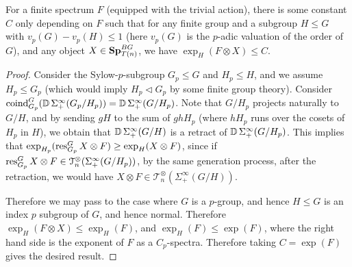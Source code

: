 	\begin{lemma}\label{Unif_nilp_exp_fin_sp}
		For a finite spectrum $F$ (equipped with the trivial action), there is some constant $C$ only depending on $F$ such that for any finite group and a subgroup $H\leq G$ with $v_p(G)-v_p(H)\leq 1$ (here $v_p(G)$ is the $p$-adic valuation of the order of $G$), and any object $X\in\mathbf{Sp}_{T(n)}^{BG}$, we have $\exp_H(F\otimes X)\leq C$. 
	\end{lemma}
	\begin{proof}
		Consider the Sylow-$p$-subgroup $G_p\leq G$ and $H_p\leq H$, and we assume $H_p\leq G_p$ (which would imply $H_p\triangleleft G_p$ by some finite group theory). Consider $\operatorname{\mathrm{coind}}_{G_p}^G(\operatorname{\mathbb{D}}\Sigma^\infty_+(G_p/H_p))=\operatorname{\mathbb{D}}\Sigma^\infty_+(G/H_p)$. Note that $G/H_p$ projects naturally to $G/H$, and by sending $gH$ to the sum of $ghH_p$ (where $hH_p$ runs over the cosets of $H_p$ in $H$), we obtain that $\operatorname{\mathbb{D}}\Sigma^\infty_+(G/H)$ is a retract of $\operatorname{\mathbb{D}}\Sigma^\infty_+(G/H_p)$. This implies that $\exp_{H_p}(\operatorname{\mathrm{res}}_{G_p}^GX\otimes F)\geq\exp_H(X\otimes F)$, since if $\operatorname{\mathrm{res}}_{G_p}^GX\otimes F\in\mathcal{T}^\otimes_n(\Sigma^\infty_+(G/H_p))$, by the same generation process, after the retraction, we would have $X\otimes F\in\mathcal{T}^\otimes_n(\Sigma^\infty_+(G/H))$. 

		Therefore we may pass to the case where $G$ is a $p$-group, and hence $H\leq G$ is an index $p$ subgroup of $G$, and hence normal. Therefore $\exp_H(F\otimes X)\leq\exp_H(F)$, and $\exp_H(F)\leq\exp(F)$, where the right hand side is the exponent of $F$ as a $C_p$-spectra. Therefore taking $C=\exp(F)$ gives the desired result. 
	\end{proof}

